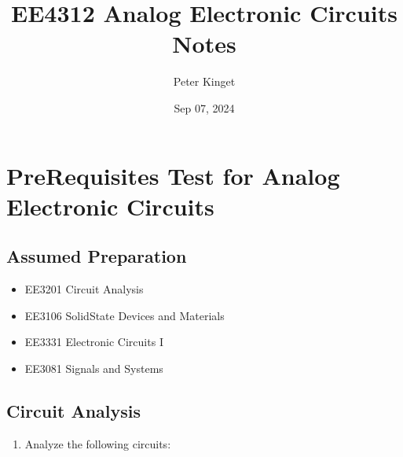 \documentclass[letterpaper,10pt,english]{jupyterBook}
\title{EE4312 Analog Electronic Circuits Notes}
\date{Sep 07, 2024}
\author{Peter Kinget}
\begin{document}
\pagestyle{empty}
\sphinxmaketitle
\pagestyle{plain}
\sphinxtableofcontents
\pagestyle{normal}
\label{\detokenize{intro::doc}}


\sphinxstepscope


\chapter{Pre\sphinxhyphen{}Requisites Test for Analog Electronic Circuits}
\label{\detokenize{TestYourKnowledge/AEC_prereq_test/AEC_entry_test:pre-requisites-test-for-analog-electronic-circuits}}\label{\detokenize{TestYourKnowledge/AEC_prereq_test/AEC_entry_test::doc}}

\section{Assumed Preparation}
\label{\detokenize{TestYourKnowledge/AEC_prereq_test/AEC_entry_test:assumed-preparation}}\begin{itemize}
\item {} 
\sphinxAtStartPar
EE3201 Circuit Analysis

\item {} 
\sphinxAtStartPar
EE3106 Solid\sphinxhyphen{}State Devices and Materials

\item {} 
\sphinxAtStartPar
EE3331 Electronic Circuits I

\item {} 
\sphinxAtStartPar
EE3081 Signals and Systems

\end{itemize}


\section{Circuit Analysis}
\label{\detokenize{TestYourKnowledge/AEC_prereq_test/AEC_entry_test:circuit-analysis}}\begin{enumerate}
%
\item {} 
\sphinxAtStartPar
Analyze the following circuits:

\end{enumerate}
\end{document}

